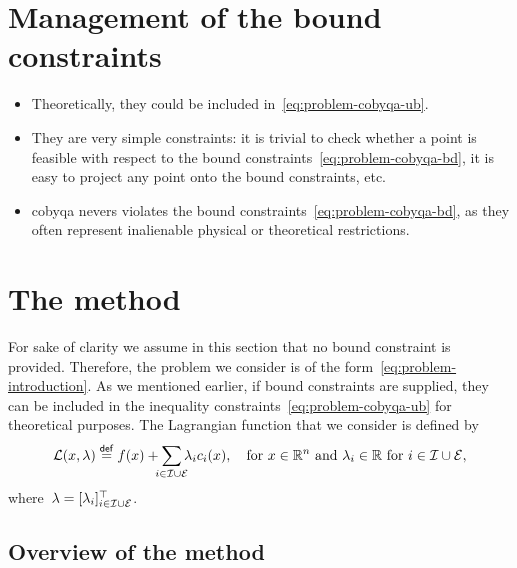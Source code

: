 \section{Management of the bound constraints}

\begin{itemize}
    \item Theoretically, they could be included in~\cref{eq:problem-cobyqa-ub}.
    \item They are very simple constraints: it is trivial to check whether a point is feasible with respect to the bound constraints~\cref{eq:problem-cobyqa-bd}, it is easy to project any point onto the bound constraints, etc.
    \item \gls{cobyqa} nevers violates the bound constraints~\cref{eq:problem-cobyqa-bd}, as they often represent inalienable physical or theoretical restrictions.
\end{itemize}

\section{The  method}

For sake of clarity we assume in this section that no bound constraint is provided.
Therefore, the problem we consider is of the form~\cref{eq:problem-introduction}.
As we mentioned earlier, if bound constraints are supplied, they can be included in the inequality constraints~\cref{eq:problem-cobyqa-ub} for theoretical purposes.
The Lagrangian function that we consider is defined by
\begin{equation*}
    \lag(x, \lambda) \eqdef \obj(x) + \sum_{\mathclap{i \in \iub \cup \ieq}} \lambda_i \con{i}(x), \quad \text{for~$x \in \R^n$ and~$\lambda_i \in \R$ for~$i \in \iub \cup \ieq$},
\end{equation*}
where~$\lambda = [\lambda_i]_{i \in \mathcal{I} \cup \mathcal{E}}^{\top}$.

\subsection{Overview of the method}

